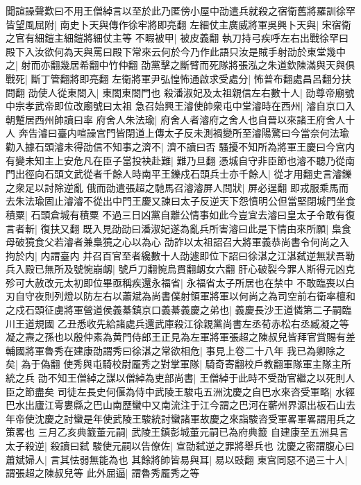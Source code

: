 聞諠譟聲歎曰不用王僧綽言以至於此乃匿傍小屋中劭遣兵就殺之宿衛舊將羅訓徐罕皆望風屈附|{
	南史卜天與傳作徐牢將即亮翻}
左細仗主廣威將軍吳興卜天與|{
	宋宿衛之官有細鎧主細鎧將細仗主等}
不暇被甲|{
	被皮義翻}
執刀持弓疾呼左右出戰徐罕曰殿下入汝欲何為天與罵曰殿下常來云何於今乃作此語只汝是賊手射劭於東堂幾中之|{
	射而亦翻幾居希翻中竹仲翻}
劭黨擊之斷臂而死隊將張泓之朱道欽陳滿與天與俱戰死|{
	斷丁管翻將即亮翻}
左衛將軍尹弘惶怖通啟求受處分|{
	怖普布翻處昌呂翻分扶問翻}
劭使人從東閤入|{
	東閤東閤門也}
殺潘淑妃及太祖親信左右數十人|{
	劭尊帝廟號中宗孝武帝即位改廟號曰太祖}
急召始興王濬使帥衆屯中堂濬時在西州|{
	濬自京口入朝蹔居西州帥讀曰率}
府舍人朱法瑜|{
	府舍人者濬府之舍人也自晉以來諸王府舍人十人}
奔告濬曰臺内喧譟宫門皆閉道上傳太子反未測禍變所至濬陽驚曰今當奈何法瑜勸入據石頭濬未得劭信不知事之濟不|{
	濟不讀曰否}
騷擾不知所為將軍王慶曰今宫内有變未知主上安危凡在臣子當投袂赴難|{
	難乃旦翻}
憑城自守非臣節也濬不聽乃從南門出徑向石頭文武從者千餘人時南平王鑠戍石頭兵士亦千餘人|{
	從才用翻史言濬鑠之衆足以討除逆亂}
俄而劭遣張超之馳馬召濬濬屏人問狀|{
	屏必逞翻}
即戎服乘馬而去朱法瑜固止濬濬不從出中門王慶又諫曰太子反逆天下怨憤明公但當堅閉城門坐食積粟|{
	石頭倉城有積粟}
不過三日凶黨自離公情事如此今豈宜去濬曰皇太子令敢有復言者斬|{
	復扶又翻}
既入見劭劭曰潘淑妃遂為亂兵所害濬曰此是下情由來所願|{
	梟食母破獍食父若濬者兼梟獍之心以為心}
劭詐以太祖詔召大將軍義恭尚書令何尚之入拘於内|{
	内謂臺内}
并召百官至者纔數十人劭遽即位下詔曰徐湛之江湛弑逆無狀吾勒兵入殿已無所及號惋崩衂|{
	號戶刀翻惋烏貫翻衂女六翻}
肝心破裂今罪人斯得元凶克殄可大赦改元太初即位畢亟稱疾還永福省|{
	永福省太子所居也在禁中}
不敢臨喪以白刃自守夜則列燈以防左右以蕭斌為尚書僕射領軍將軍以何尚之為司空前右衛率檀和之戍石頭征虜將軍營道侯義綦鎮京口義綦義慶之弟也|{
	義慶長沙王道憐第二子嗣臨川王道規國}
乙丑悉收先給諸處兵還武庫殺江徐親黨尚書左丞荀赤松右丞臧凝之等凝之燾之孫也以殷仲素為黄門侍郎王正見為左軍將軍張超之陳叔兒皆拜官賞賜有差輔國將軍魯秀在建康劭謂秀曰徐湛之常欲相危|{
	事見上卷二十八年}
我已為卿除之矣|{
	為于偽翻}
使秀與屯騎校尉龎秀之對掌軍隊|{
	騎奇寄翻校戶教翻軍隊軍主隊主所統之兵}
劭不知王僧綽之謀以僧綽為吏部尚書|{
	王僧綽于此時不受劭官繼之以死則人臣之節盡矣}
司徒左長史何偃為侍中武陵王駿屯五洲沈慶之自巴水來咨受軍略|{
	水經巴水出廬江雩婁縣之巴山南歷蠻中又南流注于江今謂之巴河在蘄州界源出板石山去年帝使沈慶之討蠻是年使武陵王駿統討蠻諸軍故慶之來詣駿咨受軍畧軍畧謂用兵之策畧也}
三月乙亥典籖董元嗣|{
	武陵王鎮彭城董元嗣已為府典籖}
自建康至五洲具言太子殺逆|{
	殺讀曰弑}
駿使元嗣以告僚佐|{
	宣劭弑逆之罪將舉兵也}
沈慶之密謂腹心曰蕭斌婦人|{
	言其怯弱無能為也}
其餘將帥皆易與耳|{
	易以豉翻}
東宫同惡不過三十人|{
	謂張超之陳叔兒等}
此外屈逼|{
	謂魯秀龎秀之等}
